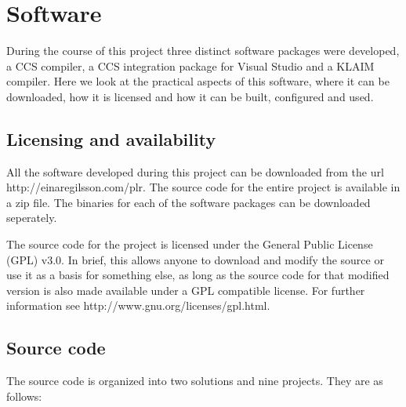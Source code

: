 \appendix

\chapter{Software}

	During the course of this project three distinct software packages were 
	developed, a CCS compiler, a CCS integration package for Visual Studio and a 
	KLAIM compiler. Here we look at the practical aspects of this software, 
	where it can be downloaded, how it is licensed and how it can be built, 
	configured and used.

\section{Licensing and availability}

	All the software developed during this project can be downloaded from the 
	url http://einaregilsson.com/plr. The source code for the entire project is 
	available in a zip file. The binaries for each of the software packages can 
	be downloaded seperately. 
	
	The source code for the project is licensed under the General Public License 
	(GPL) v3.0. In brief, this allows anyone to download and modify the source or
	use it as a basis for something else, as long as the source code for that 
	modified version is also made available under a GPL compatible license. For 
	further information see http://www.gnu.org/licenses/gpl.html.


\section{Source code}
	
	The source code is organized into two solutions and nine projects. They are 
	as follows:
	
